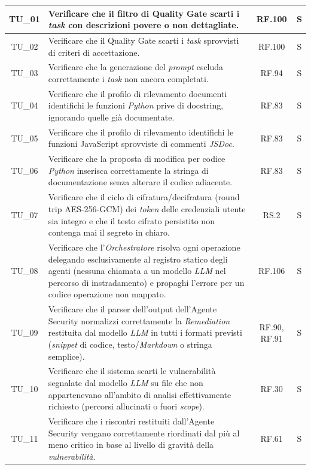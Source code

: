 \documentclass[12pt, a4paper]{article}
\newlength{\LargColVal} %
\begin{document}
\begin{xltabular}{\textwidth}{|c|X|C{\LargColVal}|C{\LargColVal}|}
    TU\_01 & Verificare che il filtro di Quality Gate scarti i \textit{task} con descrizioni povere o non dettagliate. & RF.100 & S \\ \hline
    TU\_02 & Verificare che il Quality Gate scarti i \textit{task} sprovvisti di criteri di accettazione. & RF.100 & S \\ \hline
    TU\_03 & Verificare che la generazione del \textit{prompt} escluda correttamente i \textit{task} non ancora completati. & RF.94 & S \\ \hline
    TU\_04 & Verificare che il profilo di rilevamento documenti identifichi le funzioni \textit{Python} prive di docstring, ignorando quelle già documentate. & RF.83 & S \\ \hline
    TU\_05 & Verificare che il profilo di rilevamento identifichi le funzioni JavaScript sprovviste di commenti \textit{JSDoc}. & RF.83 & S \\ \hline
    TU\_06 & Verificare che la proposta di modifica per codice \textit{Python} inserisca correttamente la stringa di documentazione senza alterare il codice adiacente. & RF.83 & S \\ \hline
    TU\_07 & Verificare che il ciclo di cifratura/decifratura (round trip AES-256-GCM) dei \textit{token} delle credenziali utente sia integro e che il testo cifrato persistito non contenga mai il segreto in chiaro. & RS.2 & S \\ \hline
    TU\_08 & Verificare che l'\textit{Orchestratore} risolva ogni operazione delegando esclusivamente al registro statico degli agenti (nessuna chiamata a un modello \textit{LLM} nel percorso di instradamento) e propaghi l'errore per un codice operazione non mappato. & RF.106 & S \\ \hline
    TU\_09 & Verificare che il parser dell'output dell'Agente Security normalizzi correttamente la \textit{Remediation} restituita dal modello \textit{LLM} in tutti i formati previsti (\textit{snippet} di codice, testo/\textit{Markdown} o stringa semplice). & RF.90, RF.91 & S \\ \hline
    TU\_10 & Verificare che il sistema scarti le vulnerabilità segnalate dal modello \textit{LLM} su file che non appartenevano all'ambito di analisi effettivamente richiesto (percorsi allucinati o fuori \textit{scope}). & RF.30 & S \\ \hline
    TU\_11 & Verificare che i riscontri restituiti dall'Agente Security vengano correttamente riordinati dal più al meno critico in base al livello di gravità della \textit{vulnerabilità}. & RF.61 & S \\ \hline


\end{xltabular}
\end{document}
